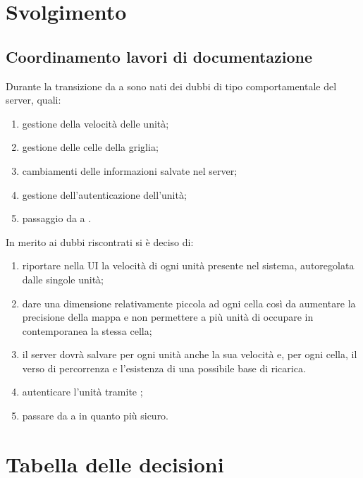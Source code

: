 \documentclass[]{article}
\begin{document}
	\newpage

	\section{Svolgimento}
		\subsection{Coordinamento lavori di documentazione}
		Durante la transizione da  a  sono nati dei dubbi di tipo comportamentale del server, quali:
		\begin{enumerate} 
			\item gestione della velocità delle unità;
			\item gestione delle celle della griglia;
			\item cambiamenti delle informazioni salvate nel server;
			\item gestione dell'autenticazione dell'unità;
			\item passaggio da  a .
		\end{enumerate}
		In merito ai dubbi riscontrati si è deciso di:
		\begin{enumerate}
			\item riportare nella UI la velocità di ogni unità presente nel sistema, autoregolata dalle singole unità;
			\item dare una dimensione relativamente piccola ad ogni cella così da aumentare la precisione della mappa e non permettere a più unità di occupare in contemporanea la stessa cella;
			\item il server dovrà salvare per ogni unità anche la sua velocità e, per ogni cella, il verso di percorrenza e l'esistenza di una possibile base di ricarica. 
			\item autenticare l'unità tramite ;
			\item passare da  a  in quanto più sicuro.
		\end{enumerate} 



	\newpage

	\section{Tabella delle decisioni}
\end{document}
